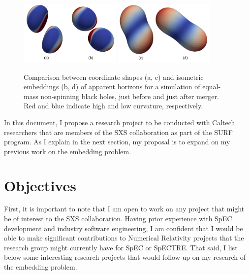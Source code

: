 \documentclass{../letter}
\begin{document}
	
	\begin{figure}[H]
		\centering
		\includegraphics[height=120px]{assets/NonSpinning_PreMerger.png}
		\includegraphics[height=120px]{assets/NonSpinning_PostMerger.png}
		\caption{Comparison between coordinate shapes (a, c) and isometric embeddings (b, d) of apparent horizons for a simulation of equal-mass non-spinning black holes, just before and just after merger. Red and blue indicate high and low curvature, respectively.}
		\label{fig:comparison}
	\end{figure}

	In this document, I propose a research project to be conducted with Caltech researchers that are members of the SXS collaboration as part of the SURF program. As I explain in the next section, my proposal is to expand on my previous work on the embedding problem.

	\section{Objectives}

	First, it is important to note that I am open to work on any project that might be of interest to the SXS collaboration. Having prior experience with SpEC development and industry software engineering, I am confident that I would be able to make significant contributions to Numerical Relativity projects that the research group might currently have for SpEC or SpECTRE. That said, I list below some interesting research projects that would follow up on my research of the embedding problem.
\end{document}
